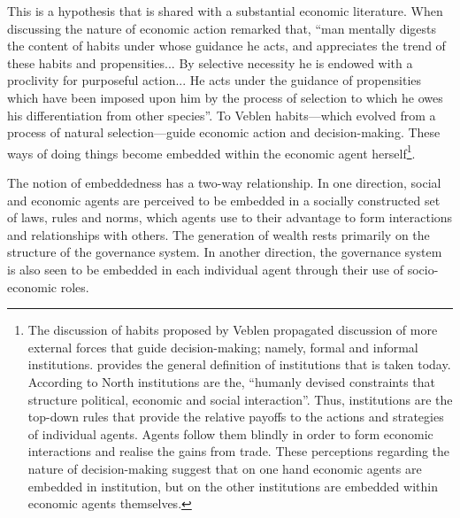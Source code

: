 This is a hypothesis that is shared with a substantial economic literature. When discussing the nature of economic action \citet[p.~188--193]{Veblen1989b} remarked that, ``man mentally digests the content of habits under whose guidance he acts, and appreciates the trend of these habits and propensities...  By selective necessity he is endowed with a proclivity for purposeful action... He acts under the guidance of propensities which have been imposed upon him by the process of selection to which he owes his differentiation from other species''. To Veblen habits---which evolved from a process of natural selection---guide economic action and decision-making. These ways of doing things become embedded within the economic agent herself\footnote{The discussion of habits proposed by Veblen propagated discussion of more external forces that guide decision-making; namely, formal and informal institutions. \citet[p.~4]{North1991b} provides the general definition of institutions that is taken today. According to North institutions are the, ``humanly devised constraints that structure political, economic and social interaction''. Thus, institutions are the top-down rules that provide the relative payoffs to the actions and strategies of individual agents. Agents follow them blindly in order to form economic interactions and realise the gains from trade. These perceptions regarding the nature of decision-making suggest that on one hand economic agents are embedded in institution, but on the other institutions are embedded within economic agents themselves.}.


The notion of embeddedness has a two-way relationship. In one direction, social and economic agents are perceived to be embedded in a socially constructed set of laws, rules and norms, which agents use to their advantage to form interactions and relationships with others. The generation of wealth rests primarily on the structure of the governance system. In another direction, the governance system is also seen to be embedded in each individual agent through their use of socio-economic roles. 

